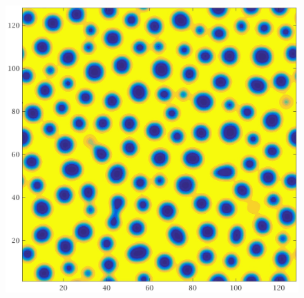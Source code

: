 \documentclass[a4paper,6pt]{article}
\begin{document}
\begin{figure}[H]
\begin{minipage}[b]{.32\linewidth}
        \end{minipage}
                \begin{minipage}[b]{.32\linewidth}
                \centering
                \includegraphics[width=1\textwidth]{pics/C3_t3.jpg}
        \end{minipage}
        

\end{figure}
\end{document}
